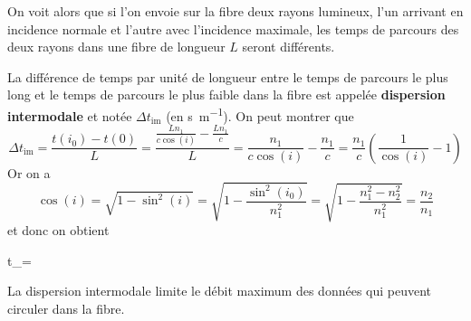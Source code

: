 \documentclass{cours}
\begin{document}
On voit alors que si l'on envoie sur la fibre deux rayons lumineux, l'un arrivant en incidence normale et l'autre avec l'incidence maximale, les temps de parcours des deux rayons dans une fibre de longueur $L$  seront différents.

La différence de temps par unité de longueur entre le temps de parcours le plus long et le temps de parcours le plus faible dans la fibre est appelée \textbf{dispersion intermodale} et notée $\Delta t_\text{im}$ (en \si{\second\per\meter}). On peut montrer que 
\begin{equation}
  \Delta t_\text{im} = \frac{t(i_0)-t(0)}{L}= \frac{\frac{Ln_1}{c\cos(i)}-\frac{Ln_1}{c}}{L} = \frac{n_1}{c\cos(i)}-\frac{n_1}{c} = \frac{n_1}{c}\left( \frac{1}{\cos(i)}-1 \right) 
\end{equation}
Or on a 
\begin{equation}
  \cos(i) = \sqrt{1-\sin^2(i)} = \sqrt{1-\frac{\sin^2(i_0)}{n_1^2}} = \sqrt{1-\frac{n_1^2-n_2^2}{n_1^2}} = \frac{n_2}{n_1}
\end{equation}
et donc on obtient
\begin{eqencadre}
  \Delta t_=
\end{eqencadre}
La dispersion intermodale limite le débit maximum des données qui peuvent circuler dans la fibre.
\end{document}
